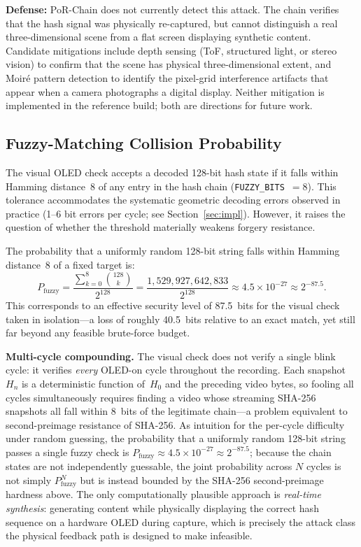 \documentclass[11pt]{article}
\begin{document}
\textbf{Defense:} PoR-Chain does not currently detect this attack. The chain
verifies that the hash signal was physically re-captured, but cannot distinguish a
real three-dimensional scene from a flat screen displaying synthetic content.
Candidate mitigations include depth sensing (ToF, structured light, or stereo
vision) to confirm that the scene has physical three-dimensional extent, and
Moiré pattern detection to identify the pixel-grid interference artifacts that
appear when a camera photographs a digital display. Neither mitigation is
implemented in the reference build; both are directions for future work.

\subsection{Fuzzy-Matching Collision Probability}
\label{sec:fuzzy-prob}

The visual OLED check accepts a decoded 128-bit hash state if it falls within
Hamming distance~8 of any entry in the hash chain (\texttt{FUZZY\_BITS}~$= 8$).
This tolerance accommodates the systematic geometric decoding errors observed in
practice (1--6 bit errors per cycle; see Section~\ref{sec:impl}).
However, it raises the question of whether the threshold materially weakens
forgery resistance.

The probability that a uniformly random 128-bit string falls within Hamming
distance~8 of a fixed target is:
\[
  P_{\mathrm{fuzzy}}
  = \frac{\displaystyle\sum_{k=0}^{8}\binom{128}{k}}{2^{128}}
  = \frac{1{,}529{,}927{,}642{,}833}{2^{128}}
  \approx 4.5 \times 10^{-27}
  \approx 2^{-87.5}.
\]
This corresponds to an effective security level of 87.5~bits for the visual
check taken in isolation---a loss of roughly 40.5~bits relative to an exact
match, yet still far beyond any feasible brute-force budget.

\textbf{Multi-cycle compounding.}  The visual check does not verify a single
blink cycle: it verifies \emph{every} OLED-on cycle throughout the recording.
Each snapshot $H_n$ is a deterministic function of~$H_0$ and the preceding video
bytes, so fooling all cycles simultaneously requires finding a video whose
streaming SHA-256 snapshots all fall within 8~bits of the legitimate chain---a
problem equivalent to second-preimage resistance of SHA-256.
As intuition for the per-cycle difficulty under random guessing, the probability
that a uniformly random 128-bit string passes a single fuzzy check is
$P_{\mathrm{fuzzy}} \approx 4.5 \times 10^{-27} \approx 2^{-87.5}$; because the
chain states are not independently guessable, the joint probability across $N$
cycles is not simply $P_{\mathrm{fuzzy}}^N$ but is instead bounded by the
SHA-256 second-preimage hardness above.
The only computationally plausible approach is \emph{real-time synthesis}:
generating content while physically displaying the correct hash sequence on a
hardware OLED during capture, which is precisely the attack class the physical
feedback path is designed to make infeasible.
\end{document}
